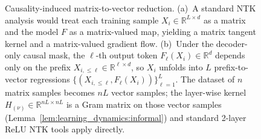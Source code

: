 \documentclass[11pt]{article}
\theoremstyle{plain}
\begin{document}
\begin{figure}[t]
\caption{Causality-induced matrix-to-vector reduction. (a)~A standard NTK analysis would treat each training sample $X_i\in\mathbb{R}^{L\times d}$ as a matrix and the model $F$ as a matrix-valued map, yielding a matrix tangent kernel and a matrix-valued gradient flow. (b)~Under the decoder-only causal mask, the $\ell$-th output token $F_\ell(X_i)\in\mathbb{R}^d$ depends only on the prefix $X_{i,\le\ell}\in\mathbb{R}^{\ell\times d}$, so $X_i$ unfolds into $L$ prefix-to-vector regressions $\{(X_{i,\le\ell}, F_\ell(X_i))\}_{\ell=1}^L$. The dataset of $n$ matrix samples becomes $nL$ vector samples; the layer-wise kernel $H_{(\nu)}\in\mathbb{R}^{nL\times nL}$ is a Gram matrix on those vector samples (Lemma~\ref{lem:learning_dynamics:informal}) and standard 2-layer ReLU NTK tools apply directly.}
\label{fig:matrix_to_vector_reduction}
\end{figure}
\end{document}

